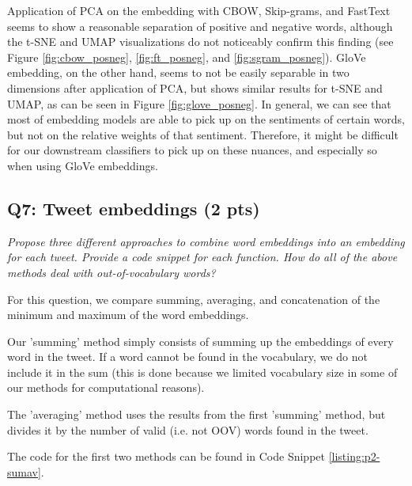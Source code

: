 Application of PCA on the embedding with CBOW, Skip-grams, and FastText seems to show a reasonable separation of positive and negative words, although the t-SNE and UMAP visualizations do not noticeably confirm this finding (see Figure \ref{fig:cbow_posneg}, \ref{fig:ft_posneg}, and \ref{fig:sgram_posneg}). GloVe embedding, on the other hand, seems to not be easily separable in two dimensions after application of PCA, but shows similar results for t-SNE and UMAP, as can be seen in Figure \ref{fig:glove_posneg}.
In general, we can see that most of embedding models are able to pick up on the sentiments of certain words, but not on the relative weights of that sentiment. Therefore, it might be difficult for our downstream classifiers to pick up on these nuances, and especially so when using GloVe embeddings.

\subsection*{Q7: Tweet embeddings (2 pts)}
\textit{Propose three different approaches to combine word embeddings into an embedding for each tweet. Provide a code snippet for each function. How do all of the above methods deal with out-of-vocabulary words?}

For this question, we compare summing, averaging, and concatenation of the minimum and maximum of the word embeddings.

Our 'summing' method simply consists of summing up the embeddings of every word in the tweet. If a word cannot be found in the vocabulary, we do not include it in the sum (this is done because we limited vocabulary size in some of our methods for computational reasons).

The 'averaging' method uses the results from the first 'summing' method, but divides it by the number of valid (i.e. not OOV) words found in the tweet.

The code for the first two methods can be found in Code Snippet \ref{listing:p2-sumav}.

